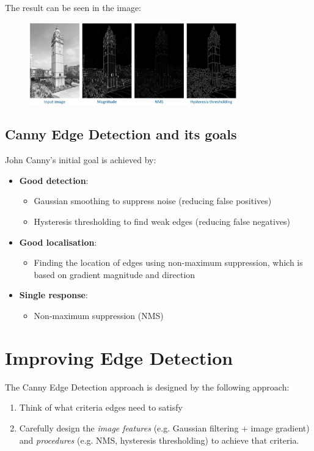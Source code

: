 \documentclass{report}
\begin{document}
The result can be seen in the image:
\begin{figure}[h]
    \centering
    \includegraphics[width=9cm]{Process hysteresis.JPG}
\end{figure}

\subsection{Canny Edge Detection and its goals}

John Canny's initial goal is achieved by:
\begin{itemize}
    \item \textbf{Good detection}: 
    \begin{itemize}
        \item Gaussian smoothing to suppress noise (reducing false positives)
        \item Hysteresis thresholding to find weak edges (reducing false negatives)
    \end{itemize}
    \item \textbf{Good localisation}:
    \begin{itemize}
        \item Finding the location of edges using non-maximum suppression, which is based on gradient
        magnitude and direction
    \end{itemize}
    \item \textbf{Single response}:
    \begin{itemize}
        \item Non-maximum suppression (NMS)
    \end{itemize}
\end{itemize}

\section{Improving Edge Detection}

The Canny Edge Detection approach is designed by the following approach:
\begin{enumerate}
    \item Think of what criteria edges need to satisfy
    \item Carefully design the \textit{image features} (e.g. Gaussian filtering + image gradient)
    and \textit{procedures} (e.g. NMS, hysteresis thresholding) to achieve that criteria.
\end{enumerate}
\end{document}
